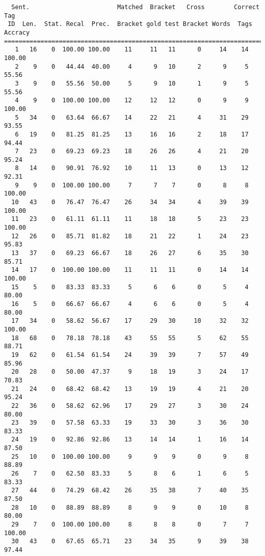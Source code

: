 \scriptsize
\begin{verbatim}
  Sent.                        Matched  Bracket   Cross        Correct Tag
 ID  Len.  Stat. Recal  Prec.  Bracket gold test Bracket Words  Tags Accracy
============================================================================
   1   16    0  100.00 100.00    11     11   11      0     14    14   100.00
   2    9    0   44.44  40.00     4      9   10      2      9     5    55.56
   3    9    0   55.56  50.00     5      9   10      1      9     5    55.56
   4    9    0  100.00 100.00    12     12   12      0      9     9   100.00
   5   34    0   63.64  66.67    14     22   21      4     31    29    93.55
   6   19    0   81.25  81.25    13     16   16      2     18    17    94.44
   7   23    0   69.23  69.23    18     26   26      4     21    20    95.24
   8   14    0   90.91  76.92    10     11   13      0     13    12    92.31
   9    9    0  100.00 100.00     7      7    7      0      8     8   100.00
  10   43    0   76.47  76.47    26     34   34      4     39    39   100.00
  11   23    0   61.11  61.11    11     18   18      5     23    23   100.00
  12   26    0   85.71  81.82    18     21   22      1     24    23    95.83
  13   37    0   69.23  66.67    18     26   27      6     35    30    85.71
  14   17    0  100.00 100.00    11     11   11      0     14    14   100.00
  15    5    0   83.33  83.33     5      6    6      0      5     4    80.00
  16    5    0   66.67  66.67     4      6    6      0      5     4    80.00
  17   34    0   58.62  56.67    17     29   30     10     32    32   100.00
  18   68    0   78.18  78.18    43     55   55      5     62    55    88.71
  19   62    0   61.54  61.54    24     39   39      7     57    49    85.96
  20   28    0   50.00  47.37     9     18   19      3     24    17    70.83
  21   24    0   68.42  68.42    13     19   19      4     21    20    95.24
  22   36    0   58.62  62.96    17     29   27      3     30    24    80.00
  23   39    0   57.58  63.33    19     33   30      3     36    30    83.33
  24   19    0   92.86  92.86    13     14   14      1     16    14    87.50
  25   10    0  100.00 100.00     9      9    9      0      9     8    88.89
  26    7    0   62.50  83.33     5      8    6      1      6     5    83.33
  27   44    0   74.29  68.42    26     35   38      7     40    35    87.50
  28   10    0   88.89  88.89     8      9    9      0     10     8    80.00
  29    7    0  100.00 100.00     8      8    8      0      7     7   100.00
  30   43    0   67.65  65.71    23     34   35      9     39    38    97.44

\end{verbatim}
